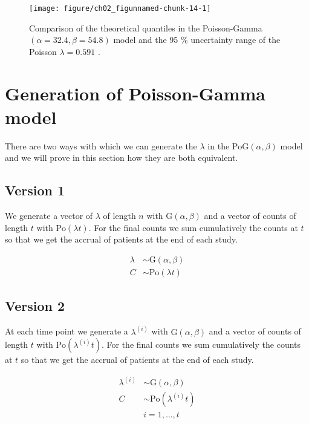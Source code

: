 \begin{figure}
\begin{knitrout}
\color{fgcolor}

{\centering \texttt{[image: figure/ch02\_figunnamed-chunk-14-1]} 

}


\end{knitrout}
  \caption{Comparison of the theoretical quantiles in the Poisson-Gamma $(\alpha = 32.4, \beta = 54.8)$ model and the 95 \% uncertainty range of the Poisson $\lambda = 0.591$ \citep{spiegelhalter2011visualizing, pkgacc}.}
  \label{fig:2_11a}
\end{figure}

\section{Generation of Poisson-Gamma model}

There are two ways with which we can generate the $\lambda$ in the $\textrm{PoG}(\alpha, \beta)$ model and we will prove in this section how they are both equivalent.

\subsection{Version 1}

We generate a vector of $\lambda$ of length $n$ with $\textrm{G}(\alpha, \beta)$ and a vector of counts of length $t$ with $\textrm{Po}(\lambda t)$. For the final counts we sum cumulatively the counts at $t$ so that we get the accrual of patients at the end of each study.

\begin{align*}
\lambda &\sim \textrm{G}(\alpha, \beta) \\
C &\sim \textrm{Po} (\lambda t)
\end{align*}

\subsection{Version 2}

At each time point we generate a $\lambda^{(i)}$ with $\textrm{G}(\alpha, \beta)$ and a vector of counts of length $t$ with $\textrm{Po}(\lambda^{(i)} t)$. For the final counts we sum cumulatively the counts at $t$ so that we get the accrual of patients at the end of each study.

\begin{align*}
\lambda^{(i)} &\sim \textrm{G}(\alpha, \beta) \\
C &\sim \textrm{Po} (\lambda^{(i)} t)\\
& i = 1, \ldots, t 
\end{align*}



